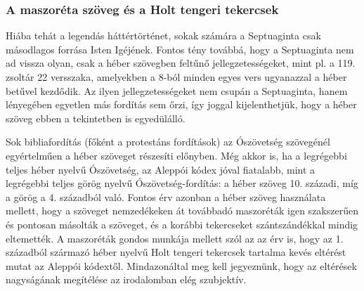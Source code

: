 \documentclass{article}
\begin{document}
\subsubsection{A maszoréta szöveg és a Holt tengeri tekercsek}

Hiába tehát a legendás háttértörténet, sokak számára a Septuaginta csak másodlagos forrása
Isten Igéjének. Fontos tény továbbá, hogy a Septuaginta nem ad vissza olyan, csak a héber szövegben feltűnő
jellegzetességeket, mint pl. a 119. zsoltár 22 versszaka, amelyekben a 8-ból minden egyes vers
ugyanazzal a héber betűvel kezdődik. Az ilyen jellegzetességeket nem csupán a Septuaginta, hanem lényegében
egyetlen más fordítás sem őrzi, így joggal kijelenthetjük, hogy a héber szöveg
ebben a tekintetben is egyedülálló.

Sok bibliafordítás (főként a protestáns fordítások) az Ószövetség szövegénél egyértelműen a héber szöveget
részesíti előnyben. Még akkor is, ha a legrégebbi teljes héber nyelvű Ószövetség,
az Aleppói kódex jóval fiatalabb, mint a legrégebbi teljes görög nyelvű Ószövetség-fordítás:
a héber szöveg 10. századi, míg a görög a 4. századból való. Fontos érv azonban a héber szöveg
használata mellett, hogy a szöveget nemzedékeken át továbbadó maszoréták igen szakszerűen és pontosan
másolták a szöveget, és a korábbi tekercseket szántszándékkal mindig eltemették. A maszoréták
gondos munkája mellett szól az az érv is, hogy az 1. századból származó héber nyelvű Holt tengeri tekercsek tartalma
kevés eltérést mutat az Aleppói kódextől. Mindazonáltal meg kell jegyeznünk, hogy
az eltérések nagyságának megítélése az irodalomban elég szubjektív.
\end{document}
